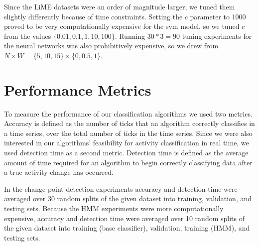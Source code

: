 Since the LiME datasets were an order of magnitude larger, we tuned them
slightly differently because of time constraints. Setting the $c$ parameter to
1000 proved to be very computationally expensive for the svm model, so we tuned $c$
from the values $\{0.01,0.1,1,10,100\}$. Running $30*3=90$ tuning experiments
for the neural networks was also prohibitively expensive, so we drew from
$N \times W = \{5,10,15\} \times \{0,0.5,1\}$.




\section{Performance Metrics}
To measure the performance of our classification algorithms we used
two metrics. Accuracy is defined as the number of ticks that an algorithm
correctly classifies in a time series, over the total number of ticks
in the time series. Since we were also interested in our algorithms'
feasibility for activity classification in real time, we used detection time as
a second metric. Detection time is defined as the average amount of time
required for an algorithm to begin correctly classifying data after a
true activity change has occurred.

In the change-point detection experiments accuracy and detection time were
averaged over 30 random splits of the given dataset into training, validation, and
testing sets. Because the HMM experiments were more computationally
expensive, accuracy and detection time were averaged over 10 random splits of
the given dataset into training (base classifier), validation, training (HMM),
and testing sets.
